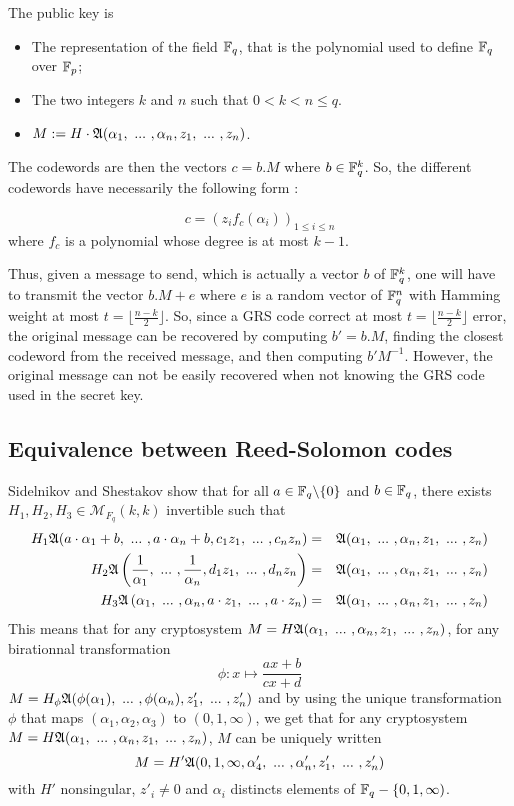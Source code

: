 \documentclass[12pt,a4paper,titlepage]{article}
\begin{document}
The public key is
\begin{itemize}
\item The representation of the field $\mathbb{F}_q$, that is the polynomial used to define $\mathbb{F}_q$ over $\mathbb{F}_p$;
\item The two integers $k$ and $n$ such that $ 0 < k < n \leq q$.
\item $M := H \cdot \mathfrak{A}(\alpha_1, \ ... \ , \alpha_n, z_1, \ ... \ , z_n)$.
\end{itemize}

The codewords are then the vectors $c=b.M$ where $b\in\mathbb{F}_q^k$. So, the different codewords have necessarily the following form :

$$c=(z_if_c(\alpha_i))_{1\leq i\leq n}$$ where $f_c$ is a polynomial whose degree is at most $k-1$.


Thus, given a message to send, which is actually a vector $b$ of $\mathbb{F}_q^k$, one will have to transmit the vector $b.M + e$ where $e$ is a random vector of $\mathbb{F}_q^n$ with Hamming weight at most $t=\lfloor\frac{n-k}{2}\rfloor$.
So, since a GRS code correct at most $t=\lfloor\frac{n-k}{2}\rfloor$ error, the original message can be recovered by computing $b'=b.M$, finding the closest codeword from the received message, and then computing $b'M^{-1}$.
However, the original message can not be easily recovered when not knowing the GRS code used in the secret key.

\subsection{Equivalence between Reed-Solomon codes}

Sidelnikov and Shestakov show \cite{SidelShes92} that for all $a \in \mathbb{F}_q\backslash\{0\}$ and $b \in \mathbb{F}_q$, there exists $H_1, H_2, H_3 \in \mathcal{M}_{F_q}(k,k)$ invertible such that
\begin{eqnarray*}
H_1 \A(a\cdot\alpha_1 + b, \ ... \ , a\cdot \alpha_n + b, c_1z_1, \ ... \ , c_n z_n) &=& \A(\alpha_1, \ ... \ , \alpha_n, z_1, \ ... \ , z_n) \\
H_2 \A\left( \frac{1}{\alpha_1}, \ ... \ , \frac{1}{\alpha_n}, d_1z_1, \ ... \ , d_n z_n \right) &=& \A(\alpha_1, \ ... \ , \alpha_n, z_1, \ ... \ , z_n) \\
H_3 \A\left( \alpha_1, \ ... \ , \alpha_n, a\cdot z_1, \ ... \ , a\cdot z_n \right) &=& \A(\alpha_1, \ ... \ , \alpha_n, z_1, \ ... \ , z_n)
\end{eqnarray*}
This means that for any cryptosystem $M = H \A(\alpha_1, \ ... \ , \alpha_n, z_1, \ ... \ , z_n)$, for any birationnal transformation
$$ \phi : x \mapsto \frac{ax+b}{cx+d} $$
$M = H_{\phi} \mathfrak{A}(\phi(\alpha_1), \ ... \ , \phi(\alpha_n), z'_1, \ ... \ , z'_n)$ and by using the unique transformation $\phi$ that maps $(\alpha_1, \alpha_2, \alpha_3)$ to $(0,1,\infty)$, we get that for any cryptosystem $M = H \A(\alpha_1, \ ... \ , \alpha_n, z_1, \ ... \ , z_n)$, $M$ can be uniquely written
$$ M = H' \mathfrak{A}(0, 1, \infty, \alpha'_4, \ ... \ , \alpha'_n, z'_1, \ ... \ , z'_n) $$
with $H'$ nonsingular, $z'_i \neq 0$ and $\alpha_i$ distincts elements of $\mathbb{F}_q-\{0, 1, \infty)$.
\end{document}
